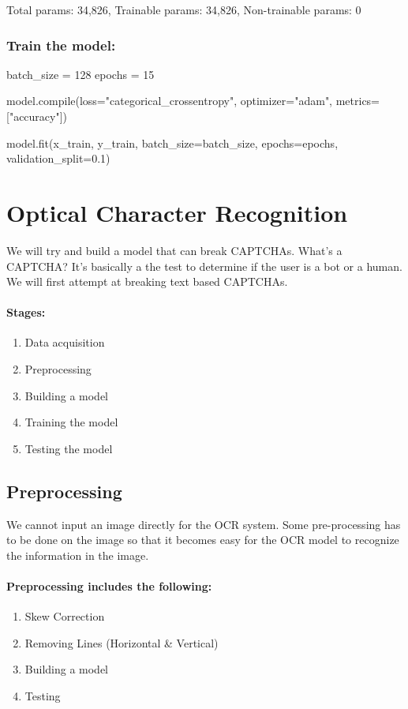 \documentclass[12pt]{article}
\theoremstyle{mytheoremstyle}
\theoremstyle{mytheoremstyle}
\theoremstyle{myproblemstyle}
\begin{document}
    \vspace{10px}
    Total params: 34,826,
    Trainable params: 34,826,
    Non-trainable params: 0

    \subsubsection{Train the model:}
    \begin{python}
      batch_size = 128
      epochs = 15

      model.compile(loss="categorical_crossentropy", optimizer="adam",
        metrics=["accuracy"])

      model.fit(x_train, y_train, batch_size=batch_size, epochs=epochs,
        validation_split=0.1)
    \end{python}

\pagebreak
\section{Optical Character Recognition}

  We will try and build a model that can break CAPTCHAs. What's a CAPTCHA? It's basically a the test to determine if the user is a bot or a human. We will first attempt at breaking text based CAPTCHAs.
  
  \paragraph{Stages:}
  \begin{enumerate}
    \item Data acquisition
    \item Preprocessing
    \item Building a model
    \item Training the model
    \item Testing the model
  \end{enumerate}

  \subsection{Preprocessing}
    We cannot input an image directly for the OCR system. Some pre-processing has to be done on the image so that it becomes easy for the OCR model to recognize the information in the image.

    \paragraph{Preprocessing includes the following:}
    \begin{enumerate}
      \item Skew Correction
      \item Removing Lines (Horizontal \&  Vertical)
      \item Building a model
      \item Testing
    \end{enumerate}
    
\end{document}
